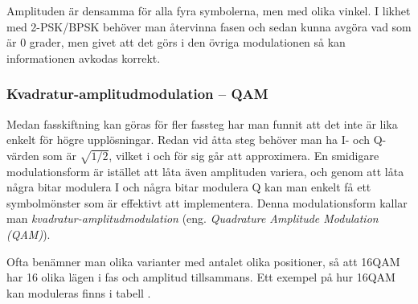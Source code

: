 Amplituden är densamma för alla fyra symbolerna, men med olika vinkel.
I likhet med 2-PSK/BPSK behöver man återvinna fasen och sedan kunna avgöra
vad som är 0 grader, men givet att det görs i den övriga modulationen så
kan informationen avkodas korrekt.

\subsubsection{Kvadratur-amplitudmodulation -- QAM}
\label{QAM}

Medan fasskiftning kan göras för fler fassteg har man funnit att det inte
är lika enkelt för högre upplösningar.
Redan vid åtta steg behöver man ha I- och Q-värden som är \(\sqrt{1/2}\), vilket
i och för sig går att approximera.
En smidigare modulationsform är istället att låta även amplituden variera,
och genom att låta några bitar modulera I och några bitar modulera Q kan
man enkelt få ett symbolmönster som är effektivt att implementera.
Denna modulationsform kallar man \emph{kvadratur-amplitudmodulation}
(eng. \emph{Quadrature Amplitude Modulation (QAM)}).

Ofta benämner man olika varianter med antalet olika positioner, så att 16QAM
har 16 olika lägen i fas och amplitud tillsammans.
Ett exempel på hur 16QAM kan moduleras finns i tabell .

